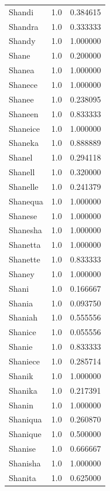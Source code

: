 \documentclass[
  letterpaper,
  DIV=11,
  numbers=noendperiod]{scrreprt}
\begin{document}
\begin{tabular}{lrr}
Shandi          &   1.0 &   0.384615 \\
Shandra         &   1.0 &   0.333333 \\
Shandy          &   1.0 &   1.000000 \\
Shane           &   1.0 &   0.200000 \\
Shanea          &   1.0 &   1.000000 \\
Shanece         &   1.0 &   1.000000 \\
Shanee          &   1.0 &   0.238095 \\
Shaneen         &   1.0 &   0.833333 \\
Shaneice        &   1.0 &   1.000000 \\
Shaneka         &   1.0 &   0.888889 \\
Shanel          &   1.0 &   0.294118 \\
Shanell         &   1.0 &   0.320000 \\
Shanelle        &   1.0 &   0.241379 \\
Shanequa        &   1.0 &   1.000000 \\
Shanese         &   1.0 &   1.000000 \\
Shanesha        &   1.0 &   1.000000 \\
Shanetta        &   1.0 &   1.000000 \\
Shanette        &   1.0 &   0.833333 \\
Shaney          &   1.0 &   1.000000 \\
Shani           &   1.0 &   0.166667 \\
Shania          &   1.0 &   0.093750 \\
Shaniah         &   1.0 &   0.555556 \\
Shanice         &   1.0 &   0.055556 \\
Shanie          &   1.0 &   0.833333 \\
Shaniece        &   1.0 &   0.285714 \\
Shanik          &   1.0 &   1.000000 \\
Shanika         &   1.0 &   0.217391 \\
Shanin          &   1.0 &   1.000000 \\
Shaniqua        &   1.0 &   0.260870 \\
Shanique        &   1.0 &   0.500000 \\
Shanise         &   1.0 &   0.666667 \\
Shanisha        &   1.0 &   1.000000 \\
Shanita         &   1.0 &   0.625000 \\

\end{tabular}
\end{document}
